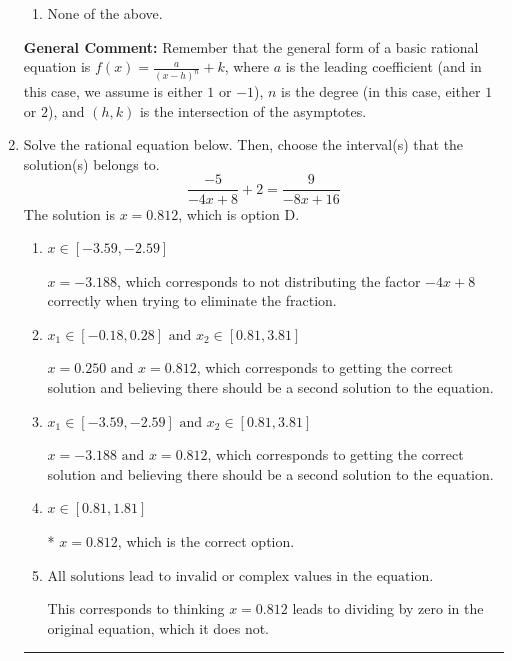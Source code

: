 \documentclass{extbook}[14pt]
\newcommand{\litem}[1]{\item #1

\rule{\textwidth}{0.4pt}}
\begin{document}
\begin{enumerate}
{\begin{enumerate}[label=\Alph*.]
\item None of the above.\end{enumerate}
\textbf{General Comment:} Remember that the general form of a basic rational equation is $ f(x) = \frac{a}{(x-h)^n} + k$, where $a$ is the leading coefficient (and in this case, we assume is either $1$ or $-1$), $n$ is the degree (in this case, either $1$ or $2$), and $(h, k)$ is the intersection of the asymptotes.
}
\litem{
Solve the rational equation below. Then, choose the interval(s) that the solution(s) belongs to.
\[ \frac{-5}{-4x + 8} + 2 = \frac{9}{-8x + 16} \]The solution is \( x = 0.812 \), which is option D.\begin{enumerate}[label=\Alph*.]
\item \( x \in [-3.59,-2.59] \)

$x = -3.188$, which corresponds to not distributing the factor $-4x + 8$ correctly when trying to eliminate the fraction.
\item \( x_1 \in [-0.18, 0.28] \text{ and } x_2 \in [0.81,3.81] \)

$x = 0.250 \text{ and } x = 0.812$, which corresponds to getting the correct solution and believing there should be a second solution to the equation.
\item \( x_1 \in [-3.59, -2.59] \text{ and } x_2 \in [0.81,3.81] \)

$x = -3.188 \text{ and } x = 0.812$, which corresponds to getting the correct solution and believing there should be a second solution to the equation.
\item \( x \in [0.81,1.81] \)

* $x = 0.812$, which is the correct option.
\item \( \text{All solutions lead to invalid or complex values in the equation.} \)

This corresponds to thinking $x = 0.812$ leads to dividing by zero in the original equation, which it does not.
\end{enumerate}

}
\end{enumerate}
\end{document}

